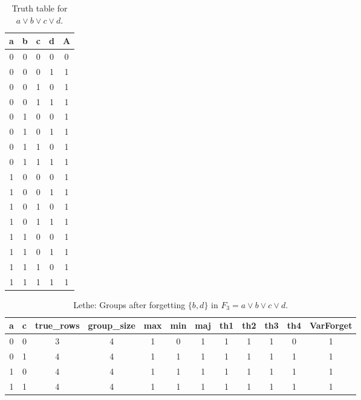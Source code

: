 \begin{table}[!tb]
    \centering
    \begin{tabular}{|c|c|c|c|c|}
        \hline
        \textbf{a} & \textbf{b} & \textbf{c} & \textbf{d} & \textbf{A} \\ \hline
        0 & 0 & 0 & 0 & 0 \\ \hline
        0 & 0 & 0 & 1 & 1 \\ \hline
        0 & 0 & 1 & 0 & 1 \\ \hline
        0 & 0 & 1 & 1 & 1 \\ \hline
        0 & 1 & 0 & 0 & 1 \\ \hline
        0 & 1 & 0 & 1 & 1 \\ \hline
        0 & 1 & 1 & 0 & 1 \\ \hline
        0 & 1 & 1 & 1 & 1 \\ \hline
        1 & 0 & 0 & 0 & 1 \\ \hline
        1 & 0 & 0 & 1 & 1 \\ \hline
        1 & 0 & 1 & 0 & 1 \\ \hline
        1 & 0 & 1 & 1 & 1 \\ \hline
        1 & 1 & 0 & 0 & 1 \\ \hline
        1 & 1 & 0 & 1 & 1 \\ \hline
        1 & 1 & 1 & 0 & 1 \\ \hline
        1 & 1 & 1 & 1 & 1 \\ \hline
    \end{tabular}
    \caption{Truth table for $a \lor b \lor c \lor d$.}
    \label{tab:truthtab}
\end{table}

\begin{table}[!tb]
    \centering
    \begin{tabular}{|c|c|c|c|c|c|c|c|c|c|c|c|}
        \hline
        \textbf{a} & \textbf{c} & \textbf{true\_rows} & \textbf{group\_size} & \textbf{max} & \textbf{min} & \textbf{maj} & \textbf{th1} & \textbf{th2} & \textbf{th3} & \textbf{th4} & \textbf{VarForget} \\ \hline
        \rowcolor{gray!40} 0 & 0 & 3 & 4 & 1 & 0 & 1 & 1 & 1 & 1 & 0 & 1 \\ \hline
        \rowcolor{blue!40} 0 & 1 & 4 & 4 & 1 & 1 & 1 & 1 & 1 & 1 & 1 & 1 \\ \hline
        \rowcolor{red!40} 1 & 0 & 4 & 4 & 1 & 1 & 1 & 1 & 1 & 1 & 1 & 1 \\ \hline
        \rowcolor{green!40} 1 & 1 & 4 & 4 & 1 & 1 & 1 & 1 & 1 & 1 & 1 & 1 \\ \hline
    \end{tabular}
    \caption{Lethe: Groups after forgetting $\{b, d\}$ in $F_{3} = a \lor b \lor c \lor d$.}
    \label{tab:lethe-F3-bd-groups}
\end{table}

